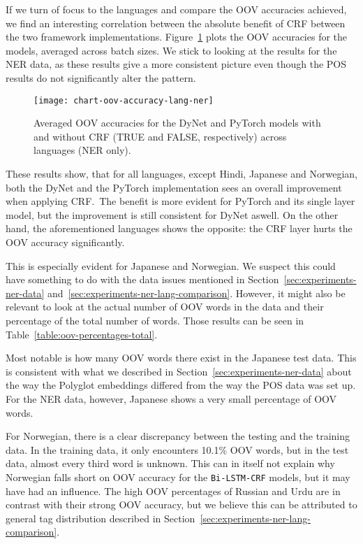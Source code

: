 If we turn of focus to the languages and compare the OOV accuracies achieved, we
find an interesting correlation between the absolute benefit of CRF between the
two framework implementations. Figure~\ref{chart:oov-accuracy-lang-ner} plots
the OOV accuracies for the models, averaged across batch sizes. We stick to
looking at the results for the NER data, as these results give a more consistent
picture even though the POS results do not significantly alter the pattern.

\begin{figure}[h!]
    \texttt{[image: chart-oov-accuracy-lang-ner]}
    \caption{Averaged OOV accuracies for the DyNet and PyTorch models with and
        without CRF (TRUE and FALSE, respectively) across languages (NER only).
    }\label{chart:oov-accuracy-lang-ner}
\end{figure}

These results show, that for all languages, except Hindi, Japanese and
Norwegian, both the DyNet and the PyTorch implementation sees an overall
improvement when applying CRF.\ The benefit is more evident for PyTorch and its
single layer model, but the improvement is still consistent for DyNet aswell. On
the other hand, the aforementioned languages shows the opposite: the CRF layer
hurts the OOV accuracy significantly.

This is especially evident for Japanese and Norwegian. We suspect this could
have something to do with the data issues mentioned in
Section~\ref{sec:experiments-ner-data}
and~\ref{sec:experiments-ner-lang-comparison}. However, it might also be
relevant to look at the actual number of OOV words in the data and their
percentage of the total number of words. Those results can be seen in
Table~\ref{table:oov-percentages-total}.

Most notable is how many OOV words there exist in the Japanese test data.
This is consistent with what we described in
Section~\ref{sec:experiments-ner-data} about the way the Polyglot embeddings
differed from the way the POS data was set up. For the NER data, however,
Japanese shows a very small percentage of OOV words.

For Norwegian, there is a clear discrepancy between the testing and the training
data. In the training data, it only encounters 10.1\% OOV words, but in the test
data, almost every third word is unknown. This can in itself not explain why
Norwegian falls short on OOV accuracy for the \texttt{Bi-LSTM-CRF} models, but
it may have had an influence. The high OOV percentages of Russian and Urdu are
in contrast with their strong OOV accuracy, but we believe this can be
attributed to general tag distribution described in
Section~\ref{sec:experiments-ner-lang-comparison}.

